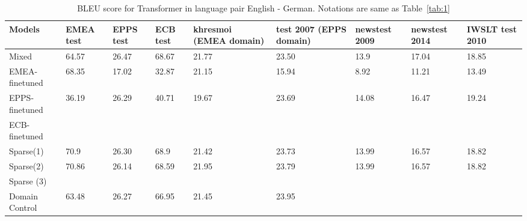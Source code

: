 \documentclass[11pt,a4paper]{article}
\begin{document}
\begin{table}
\begin{center}
 \begin{tabularx}{\textwidth}{|| X | X | X | X | X | X | X | X | X ||} 
 \hline
 Models & EMEA test & EPPS test & ECB test & khresmoi (EMEA domain) & test 2007 (EPPS domain) & newstest 2009 & newstest 2014 & IWSLT test 2010 \\ [0.5ex] 
 \hline\hline
 Mixed & 64.57 & 26.47 & 68.67 & 21.77 & 23.50 & 13.9 & 17.04 & 18.85 \\
 \hline
 EMEA-finetuned & 68.35 & 17.02 & 32.87 & 21.15 & 15.94 & 8.92 & 11.21 & 13.49 \\
 \hline
 EPPS-finetuned & 36.19 & 26.29 & 40.71 & 19.67 & 23.69 & 14.08 & 16.47 & 19.24 \\
 \hline
 ECB-finetuned &  & & & & & & & \\
 \hline
 Sparse(1) & 70.9 & 26.30 & 68.9 & 21.42 & 23.73 & 13.99 & 16.57 & 18.82 \\
 \hline
 Sparse(2) & 70.86 & 26.14 & 68.59 & 21.95 & 23.79 & 13.99 & 16.57 & 18.82 \\
 \hline
 Sparse (3) &  &  &  &  &  &  &  & \\
 \hline
 Domain Control & 63.48 & 26.27 & 66.95 & 21.45 & 23.95 & & & \\
 \hline
\end{tabularx}
\end{center}
\caption{BLEU score for Transformer in language pair English - German. Notations are same as Table~\ref{tab:1}}
\label{tab:2}
\end{table}
\end{document}
